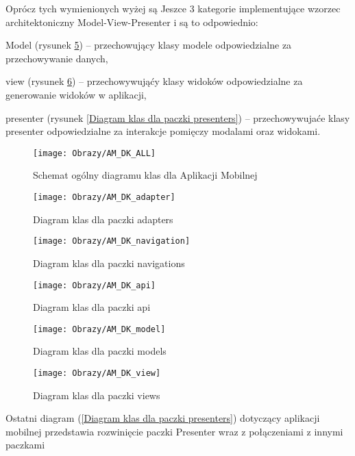 Oprócz tych wymienionych wyżej są Jeszce 3 kategorie implementujące wzorzec architektoniczny Model-View-Presenter i są to odpowiednio:
\begin{itemize*}
	\item Model (rysunek \ref{Diagram klas dla paczki models}) 
				 -- przechowujący klasy modele odpowiedzialne za przechowywanie danych,   
				\item view 
				(rysunek \ref{Diagram klas dla paczki views}) 
				-- przechowywująćy klasy widoków odpowiedzialne za generowanie widoków w aplikacji, 
				\item presenter
				(rysunek \ref{Diagram klas dla paczki presenters}) 
				 -- przechowywujaće klasy presenter odpowiedzialne za interakcje pomięczy modalami oraz widokami.
\end{itemize*}
		\newpage
		\begin{figure}[ht!]
			\centering
			\texttt{[image: Obrazy/AM\_DK\_ALL]}
			\caption{Schemat ogólny diagramu klas dla Aplikacji Mobilnej}
			\label{Schemat ogólny diagramu klas dla Aplikacji mobilnej}
		\end{figure}
	\newpage
		\begin{figure}[ht!]
		\centering
		\texttt{[image: Obrazy/AM\_DK\_adapter]}
		\caption{Diagram klas dla paczki adapters}
		\label{Diagram klas dla paczki adapters}
	\end{figure}
\newpage
		\begin{figure}[ht!]
		\centering
		\texttt{[image: Obrazy/AM\_DK\_navigation]}
		\caption{Diagram klas dla paczki navigations}
		\label{Diagram klas dla paczki navigations}
	\end{figure}
\newpage
	\begin{figure}[ht!]
		\centering
		\texttt{[image: Obrazy/AM\_DK\_api]}
		\caption{Diagram klas dla paczki api}
		\label{Diagram klas dla paczki api}
	\end{figure}
\newpage
	\begin{figure}[ht!]
		\centering
		\texttt{[image: Obrazy/AM\_DK\_model]}
		\caption{Diagram klas dla paczki models}
		\label{Diagram klas dla paczki models}
	\end{figure}

	\newpage
\begin{figure}[ht!]
	\centering
	\texttt{[image: Obrazy/AM\_DK\_view]}
	\caption{Diagram klas dla paczki views}
	\label{Diagram klas dla paczki views}
\end{figure}
\newpage
Ostatni diagram (\ref{Diagram klas dla paczki presenters}) dotyczący aplikacji mobilnej przedstawia rozwinięcie paczki Presenter wraz z połączeniami z innymi paczkami

